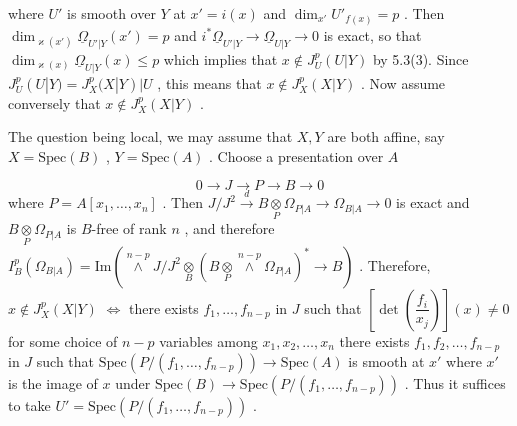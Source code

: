
where $U'$ is smooth over $Y$ at $x' = i(x)$ and $\dim_{x'}U'_{f(x)} = p$ . Then $\dim_{\varkappa(x')}\underline{\Omega}_{U'|Y}(x') = p$ and $i^{*}\underline{\Omega}_{U'|Y} \to \underline{\Omega}_{U|Y} \to 0$ is exact, so that $\dim_{\varkappa(x)}\underline{\Omega}_{U|Y}(x) \leq p$ which implies that $x \notin J^{p}_{U}(U|Y)$ by 5.3(3). Since $J^{p}_{U}(U|Y) = J^{p}_{X}(X|Y)|U$ , this means that $x \notin J^{p}_{X}(X|Y)$ . Now assume conversely that $x \notin J^{p}_{X}(X|Y)$ .

The question being local, we may assume that $X, Y$ are both affine, say $X = \mathrm{Spec}(B)$ , $Y = \mathrm{Spec}(A)$ . Choose a presentation over $A$

\begin{equation*}
0 \to J \to P \to B \to 0
\end{equation*}
where $P = A[x_1,\ldots,x_n]$ . Then $J/J^{2} \overset{d}{\to} B \underset{P}{\otimes} \Omega_{P|A} \to \Omega_{B|A} \to 0$ is exact and $B \underset{P}{\otimes} \Omega_{P|A}$ is $B$-free of rank $n$ , and therefore $I^{p}_{B}(\Omega_{B|A}) = \mathrm{Im}(\overset{n-p}{\wedge}J/J^{2} \underset{B}{\otimes} (B \underset{P}{\otimes} \overset{n-p}{\wedge}\Omega_{P|A})^{*} \to B)$ . Therefore, $x \notin J^{p}_{X}(X|Y)$ $\Leftrightarrow$ there exists $f_1,\ldots,f_{n-p}$ in $J$ such that $\left[\det\left(\dfrac{f_i}{x_j}\right)\right](x) \neq 0$ for some choice of $n-p$ variables among $x_1, x_2,\ldots,x_n$   there exists $f_1, f_2,\ldots,f_{n-p}$ in $J$ such that $\mathrm{Spec}(P/(f_1,\ldots,f_{n-p})) \to \mathrm{Spec}(A)$ is smooth at $x'$ where $x'$ is the image of $x$ under $\mathrm{Spec}(B) \to \mathrm{Spec}(P/(f_1,\ldots,f_{n-p}))$ . Thus it suffices to take $U' = \mathrm{Spec}(P/(f_1,\ldots,f_{n-p}))$ .


